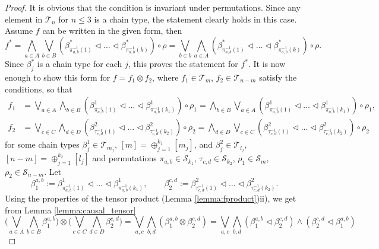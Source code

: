\documentclass[12pt]{article}
\theoremstyle{definition}
\theoremstyle{remark}
\def\Te{\mathcal T}
\def\Fe{\mathcal F}
\def\permut{\mathscr{S}}
\def\vtl{\vartriangleleft}
\begin{document}
\begin{proof} It is obvious that the condition is invariant under permutations. Since any element in $\Te_n$ for $n\le 3$ is a chain type, the statement clearly holds in
this case. 
Assume $f$ can be written in the given form, then
\[
f^*=\bigwedge _{a\in A}\bigvee_{b\in B} (\beta^*_{\pi^{-1}_{a,b}(1)}\vtl \dots \vtl
\beta^*_{\pi^{-1}_{a,b}(k)})\circ\rho=\bigvee_{b\in b}\bigwedge_{a\in A} (\beta^*_{\pi^{-1}_{a,b}(1)}\vtl \dots \vtl
\beta^*_{\pi^{-1}_{a,b}(k)})\circ\rho.
\]
Since $\beta_j^*$ is a chain type for each $j$, this proves the statement for $f^*$. 
%
%
 It is now enough to show this form for  $f=f_1\otimes f_2$, where 
$f_1\in \Te_m$, $f_2\in \Te_{n-m}$ satisfy the conditions, so that
\begin{align*}
f_1&=\bigvee_{a\in A}\bigwedge_{b\in B} (\beta^1_{\pi^{-1}_{a,b}(1)}\vtl \dots \vtl
\beta^1_{\pi^{-1}_{a,b}(k_1)})\circ\rho_1=\bigwedge_{b\in B}\bigvee_{a\in A} (\beta^1_{\pi^{-1}_{a,b}(1)}\vtl \dots \vtl
\beta^1_{\pi^{-1}_{a,b}(k_1)})\circ\rho_1,\\
f_2&=\bigvee_{c\in C}\bigwedge_{d\in D} (\beta^2_{\tau^{-1}_{c,d}(1)}\vtl \dots \vtl
\beta^2_{\tau^{-1}_{c,d}(k_2)})\circ\rho_2=\bigwedge_{d\in D} \bigvee_{c\in C}(\beta^2_{\tau^{-1}_{c,d}(1)}\vtl \dots \vtl
\beta^2_{\tau^{-1}_{c,d}(k_2)})\circ\rho_2
\end{align*}
for some chain types  $\beta^1_j\in \Te_{m_j}$, $[m]=\oplus^{k_1}_{j=1}[m_j]$, and $\beta^2_j\in \Te_{l_j}$,
$[n-m]=\oplus_{j=1}^{k_2}[l_j]$ and permutations $\pi_{a,b}\in \permut_{k_1}$, $\tau_{c,d}\in
\permut_{k_2}$, $\rho_1\in \permut_m$, $\rho_2\in \permut_{n-m}$.
Let 
\[
\beta^{a,b}_1:=\beta^1_{\pi^{-1}_{a,b}(1)}\vtl \dots \vtl
\beta^1_{\pi^{-1}_{a,b}(k_1)},\qquad \beta^{c,d}_2:= \beta^2_{\tau^{-1}_{c,d}(1)}\vtl \dots \vtl
\beta^2_{\tau^{-1}_{c,d}(k_2)}.
\]
Using the   properties of the tensor product (Lemma \ref{lemma:fproduct})ii), we get from
Lemma \ref{lemma:causal_tensor}
\[
\bigl(\bigvee_{a\in A}\bigwedge_{b\in B}\beta_1^{a,b}\bigr)\otimes \bigl(\bigvee_{c\in
C}\bigwedge_{d\in D}\beta_2^{c,d}\bigr)=\bigvee_{a,c}\bigwedge_{b,d}
(\beta_1^{a,b}\otimes \beta_2^{c,d})=\bigvee_{a,c}\bigwedge_{b,d}(\beta_1^{a,b}\vtl
\beta_2^{c,d})\wedge (\beta_2^{c,d}\vtl \beta_1^{a,b})
\]
\end{proof}
\end{document}

